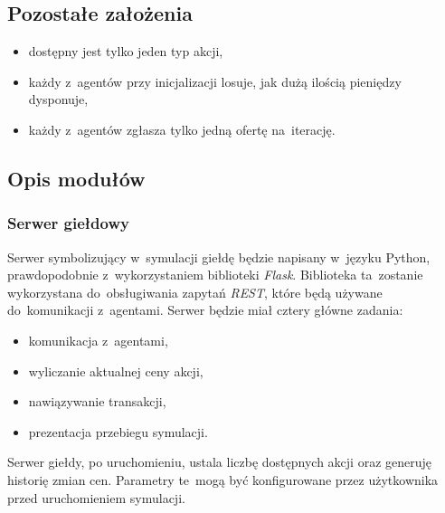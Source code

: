 \documentclass[11pt,a4paper]{article}
\begin{document}
\newpage
\subsection{Pozostałe założenia}
\begin{itemize}
  \item dostępny jest tylko jeden typ akcji,
  \item każdy z~agentów przy inicjalizacji losuje, jak dużą ilością pieniędzy dysponuje,
  \item każdy z~agentów zgłasza tylko jedną ofertę na~iterację.
\end{itemize}

\subsection{Opis modułów}
\subsubsection{Serwer giełdowy}
Serwer symbolizujący w~symulacji giełdę będzie napisany w~języku Python, prawdopodobnie z~wykorzystaniem biblioteki \textit{Flask}. Biblioteka ta~zostanie wykorzystana do~obsługiwania zapytań \textit{REST}, które będą używane do~komunikacji z~agentami. Serwer będzie miał cztery główne zadania:
\begin{multicols}{2}
  \begin{itemize}
    \item komunikacja z~agentami,
    \item wyliczanie aktualnej ceny akcji,
    \item nawiązywanie transakcji,
    \item prezentacja przebiegu symulacji.
  \end{itemize}
\end{multicols}

Serwer giełdy, po uruchomieniu, ustala liczbę dostępnych akcji oraz generuję historię zmian cen. Parametry te~mogą być konfigurowane przez użytkownika przed uruchomieniem symulacji.
\end{document}
